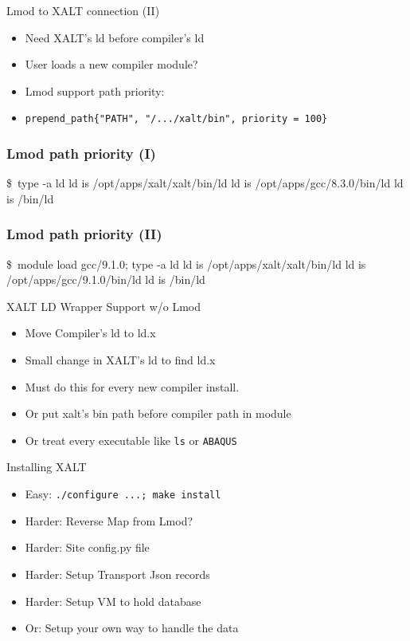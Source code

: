 \documentclass{beamer}
\begin{document}
\begin{frame}{Lmod to XALT connection (II)}
  \begin{itemize}
    \item Need XALT's ld before compiler's ld
    \item User loads a new compiler module?
    \item Lmod support path priority:
    \item \texttt{prepend\_path\{"PATH", "/.../xalt/bin", priority = 100\}}
  \end{itemize}
\end{frame}

\begin{frame}[fragile]
    \frametitle{Lmod path priority (I)}
 {\small
    \begin{semiverbatim}
\$ type -a ld                     
ld is /opt/apps/xalt/xalt/bin/ld
ld is /opt/apps/gcc/8.3.0/bin/ld
ld is /bin/ld
    \end{semiverbatim}
}
\end{frame}

\begin{frame}[fragile]
    \frametitle{Lmod path priority (II)}
 {\small
    \begin{semiverbatim}
\$ module load gcc/9.1.0; type -a ld                     
ld is /opt/apps/xalt/xalt/bin/ld
ld is /opt/apps/gcc/9.1.0/bin/ld
ld is /bin/ld
    \end{semiverbatim}
}
\end{frame}

\begin{frame}{XALT LD Wrapper Support w/o Lmod}
  \begin{itemize}
    \item Move Compiler's ld to ld.x
    \item Small change in XALT's ld to find ld.x
    \item Must do this for every new compiler install.
    \item Or put xalt's bin path before compiler path in module
    \item Or treat every executable like \texttt{ls} or \texttt{ABAQUS}
  \end{itemize}
\end{frame}

\begin{frame}{Installing XALT}
  \begin{itemize}
    \item Easy: \texttt{./configure ...; make install}
    \item Harder: Reverse Map from Lmod?
    \item Harder: Site config.py file
    \item Harder: Setup Transport Json records
    \item Harder: Setup VM to hold database
    \item Or: Setup your own way to handle the data
  \end{itemize}
\end{frame}
\end{document}
